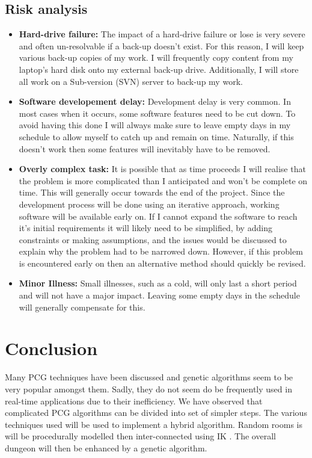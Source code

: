 \documentclass{ueacmpstyle}
\begin{document}
\subsection{Risk analysis}
\begin{itemize}
\item {\bf Hard-drive failure: } The impact of a hard-drive failure or lose is very severe and often un-resolvable if a back-up doesn't exist. For this reason, I will keep various back-up copies of my work. I will frequently copy content from my laptop's hard disk onto my external back-up drive. Additionally, I will store all work on a Sub-version (SVN) server to back-up my work.
\item {\bf Software developement delay: } Development delay is very common. In most cases when it occurs, some software features need to be cut down. To avoid having this done I will always make sure to leave empty days in my schedule to allow myself to catch up and remain on time. Naturally, if this doesn't work then some features will inevitably have to be removed.
\item {\bf Overly complex task: } It is possible that as time proceeds I will realise that the problem is more complicated than I anticipated and won't be complete on time. This will generally occur towards the end of the project. Since the development process will be done using an iterative approach, working software will be available early on. If I cannot expand the software to reach it's initial requirements it will likely need to be simplified, by adding constraints or making assumptions, and the issues would be discussed to explain why the problem had to be narrowed down. However, if this problem is encountered early on then an alternative method should quickly be revised.
\item {\bf Minor Illness: } Small illnesses, such as a cold, will only last a short period and will not have a major impact. Leaving some empty days in the schedule will generally compensate for this.
\end{itemize}

\section{Conclusion}
Many PCG techniques have been discussed and genetic algorithms seem to be very popular amongst them. Sadly, they do not seem do be frequently used in real-time applications due to their inefficiency. We have observed that complicated PCG algorithms can be divided into set of simpler steps. The various techniques used will be used to implement a hybrid algorithm. Random rooms is will be procedurally modelled then inter-connected using IK \citep{DBLP:journals/cgf/KrecklauK11}. The overall dungeon will then be enhanced by a genetic algorithm.
\end{document}

